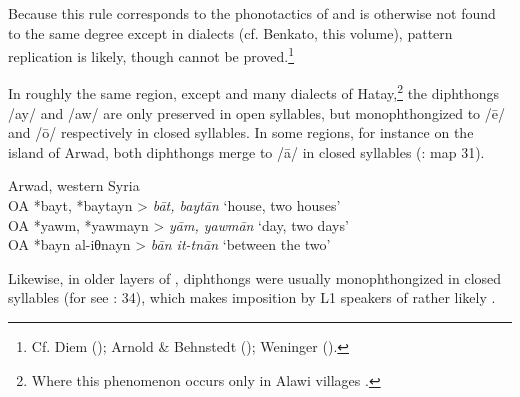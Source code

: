 \documentclass[output=paper]{langsci/langscibook}
\begin{document}
Because this rule corresponds to the phonotactics of  and is otherwise not found to the same degree except in  dialects (cf. Benkato, this volume), pattern {replication} is likely, though cannot be proved.\footnote{Cf. Diem (\citeyear[47]{Diem1979}); Arnold \& Behnstedt (\citeyear[69--71]{ArnoldBehnstedt1993}); Weninger (\citeyear[748]{Weninger2011Aramaic}).}

In roughly the same region, except  and many dialects of Hatay,\footnote{Where this phenomenon occurs only in Alawi villages \citep[84]{Arnold1998}.} the {diphthongs} /ay/ and /aw/ are only preserved in open syllables, but monophthongized to /ē/ and /ō/ respectively in closed syllables. In some regions, for instance on the island of Arwad, both {diphthongs} {merge} to /ā/ in closed syllables (\citealt{Behnstedt1997}: map 31). 

\ea 
{Arwad, western Syria \citep[278]{Procházka2013}} \\
    \textup{OA} *bayt, *baytayn > \textit{bāt, baytān} \textup{‘house, two houses’\\
OA} *yawm, *yawmayn >  \textit{yām, yawmān} \textup{‘day, two days’\\
OA} *bayn al-iθnayn > \textit{bān it-tnān} \textup{‘}\textup{between the two’}\\
\z

Likewise, in older layers of , {diphthongs} were usually monophthongized in closed syllables (for  see \citealt{Nöldeke1904Semitic}: 34), which makes {imposition} by L1 speakers of  rather likely \citep[227]{Fleisch1974Kfar}.
\end{document}
